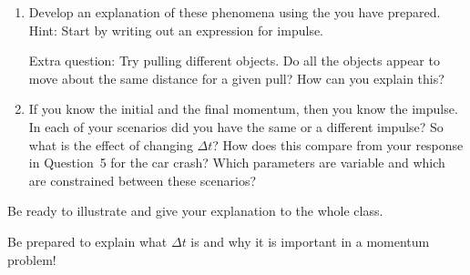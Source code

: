 \begin{enumerate}
	\item Develop an explanation of these phenomena using the \pcharts{} you have prepared. Hint: Start by writing out an expression for impulse.
	
	Extra question: Try pulling different objects. Do all the objects appear to move about the same distance for a given pull? How can you explain this?
	
	\item If you know the initial and the final momentum, then you know the impulse. In each of your scenarios did you have the same or a different impulse? So what is the effect of changing $\Delta t$? How does this compare from your response in Question~5 for the car crash? Which parameters are variable and which are constrained between these scenarios?
\end{enumerate}

Be ready to illustrate and give your explanation to the whole class.

Be prepared to explain what $\Delta t$ is and why it is important in a momentum problem!

\WCD